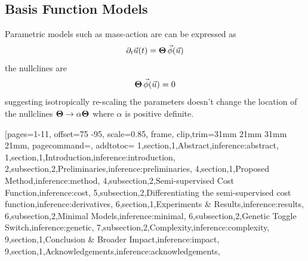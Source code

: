 \subsection{Basis Function Models}
Parametric models such as mass-action are can be expressed as
\begin{equation}
    \partial_t\vec{u}(t) = \mathbf{\Theta}\,\vec{\phi}(\vec{u})
\end{equation}
the nullclines are
\begin{equation}
    \mathbf{\Theta}\,\vec{\phi}(\vec{u}) = 0
\end{equation}
suggesting isotropically re-scaling the parameters
doesn't change the location of the nullclines $\mathbf{\Theta}\rightarrow\alpha\mathbf{\Theta}$
where $\alpha$ is positive definite.

[pages=1-11, offset=75 -95, scale=0.85, frame,
        clip,trim=31mm 21mm 31mm 21mm,
        pagecommand={}, addtotoc={
        1,section,1,Abstract,inference:abstract,
        1,section,1,Introduction,inference:introduction,
        2,subsection,2,Preliminaries,inference:preliminaries,
        4,section,1,Proposed Method,inference:method,
        4,subsection,2,Semi-supervised Cost Function,inference:cost,
        5,subsection,2,Differentiating the semi-supervised cost function,inference:derivatives,
        6,section,1,Experiments \& Results,inference:results,
        6,subsection,2,Minimal Models,inference:minimal,
        6,subsection,2,Genetic Toggle Switch,inference:genetic,
        7,subsection,2,Complexity,inference:complexity,
        9,section,1,Conclusion \& Broader Impact,inference:impact,
        9,section,1,Acknowledgements,inference:acknowledgements},
